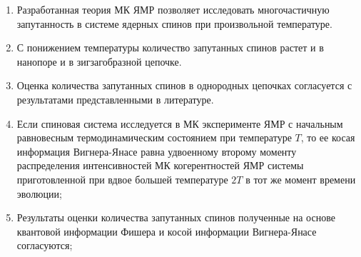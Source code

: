 \begin{enumerate}
  \item
  Разработанная теория МК ЯМР позволяет исследовать многочастичную запутанность в системе ядерных спинов при произвольной температуре.

  \item
  С понижением температуры количество запутанных спинов растет и в нанопоре и в зигзагобразной цепочке. 

  \item
  Оценка количества запутанных спинов в однородных цепочках согласуется с результатами представленными в литературе.

  \item
  Если спиновая система исследуется в МК эксперименте ЯМР с начальным равновесным термодинамическим состоянием при температуре $T$, 
  то ее косая информация Вигнера-Янасе равна удвоенному второму моменту распределения интенсивностей МК когерентностей ЯМР системы приготовленной при вдвое большей температуре $2T$ в тот же момент времени эволюции;

  \item
  Результаты оценки количества запутанных спинов полученные на основе квантовой информации Фишера и косой информации Вигнера-Янасе согласуются;
\end{enumerate}
